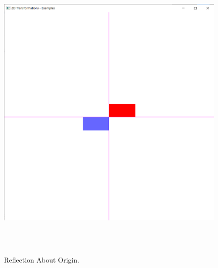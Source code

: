 \documentclass[12pt, a4]{article}
\begin{document}
\subsection*{}
\begin{figure}[h]
\centering
\caption{Reflection About Origin.}
\includegraphics[height=15cm, width=15cm]{Outputs/Output-7.png}
\end{figure}

\newpage
\end{document}
